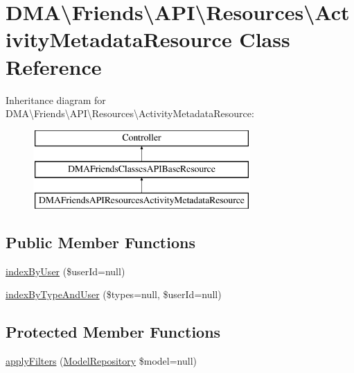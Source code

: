 \hypertarget{classDMA_1_1Friends_1_1API_1_1Resources_1_1ActivityMetadataResource}{}\section{D\+M\+A\textbackslash{}Friends\textbackslash{}A\+P\+I\textbackslash{}Resources\textbackslash{}Activity\+Metadata\+Resource Class Reference}
\label{classDMA_1_1Friends_1_1API_1_1Resources_1_1ActivityMetadataResource}
Inheritance diagram for D\+M\+A\textbackslash{}Friends\textbackslash{}A\+P\+I\textbackslash{}Resources\textbackslash{}Activity\+Metadata\+Resource\+:\begin{figure}[H]
\begin{center}
\leavevmode
\includegraphics[height=3.000000cm]{d3/d5d/classDMA_1_1Friends_1_1API_1_1Resources_1_1ActivityMetadataResource}
\end{center}
\end{figure}
\subsection*{Public Member Functions}
\begin{DoxyCompactItemize}
\item 
\hyperlink{classDMA_1_1Friends_1_1API_1_1Resources_1_1ActivityMetadataResource_ae6a01ce9c7882d3c741f471557d5a8f2}{index\+By\+User} (\$user\+Id=null)
\item 
\hyperlink{classDMA_1_1Friends_1_1API_1_1Resources_1_1ActivityMetadataResource_a489377740bd451341a243ba778b65e68}{index\+By\+Type\+And\+User} (\$types=null, \$user\+Id=null)
\end{DoxyCompactItemize}
\subsection*{Protected Member Functions}
\begin{DoxyCompactItemize}
\item 
\hyperlink{classDMA_1_1Friends_1_1API_1_1Resources_1_1ActivityMetadataResource_add571e6be47126c2bee474f570c566ab}{apply\+Filters} (\hyperlink{classDMA_1_1Friends_1_1Classes_1_1API_1_1ModelRepository}{Model\+Repository} \$model=null)
\end{DoxyCompactItemize}
